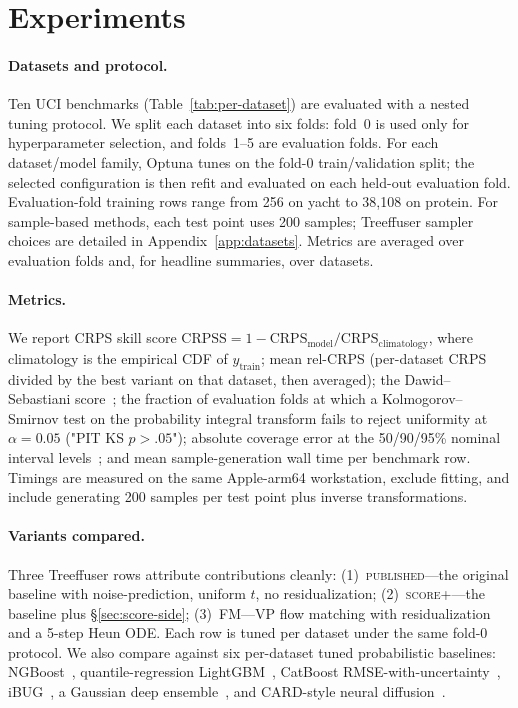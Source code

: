 \documentclass{tpm2026}
\newcommand{\crps}{\mathrm{CRPS}}
\newcommand{\crpss}{\mathrm{CRPSS}}
\begin{document}
\section{Experiments}\label{sec:exp}

\paragraph{Datasets and protocol.} Ten UCI benchmarks (Table~\ref{tab:per-dataset}) are evaluated with a nested tuning protocol. We split each dataset into six folds: fold~0 is used only for hyperparameter selection, and folds~1--5 are evaluation folds. For each dataset/model family, Optuna tunes on the fold-0 train/validation split; the selected configuration is then refit and evaluated on each held-out evaluation fold. Evaluation-fold training rows range from 256 on yacht to 38{,}108 on protein. For sample-based methods, each test point uses 200 samples; Treeffuser sampler choices are detailed in Appendix~\ref{app:datasets}. Metrics are averaged over evaluation folds and, for headline summaries, over datasets.

\paragraph{Metrics.} We report CRPS skill score $\crpss = 1 - \crps_{\text{model}} / \crps_{\text{climatology}}$, where climatology is the empirical CDF of $y_{\text{train}}$; mean rel-CRPS (per-dataset CRPS divided by the best variant on that dataset, then averaged); the Dawid--Sebastiani score~\citep{dawid1984pit}; the fraction of evaluation folds at which a Kolmogorov--Smirnov test on the probability integral transform fails to reject uniformity at $\alpha=0.05$ ("PIT KS $p{>}.05$"); absolute coverage error at the 50/90/95\% nominal interval levels~\citep{gneiting2007crps}; and mean sample-generation wall time per benchmark row. Timings are measured on the same Apple-arm64 workstation, exclude fitting, and include generating 200 samples per test point plus inverse transformations.

\paragraph{Variants compared.} Three Treeffuser rows attribute contributions cleanly: (1)~\textsc{published}---the original baseline with noise-prediction, uniform $t$, no residualization; (2)~\textsc{score+}---the baseline plus \S\ref{sec:score-side}; (3)~\textsc{FM}---VP flow matching with residualization and a 5-step Heun ODE. Each row is tuned per dataset under the same fold-0 protocol. We also compare against six per-dataset tuned probabilistic baselines: NGBoost~\citep{duan2020ngboost}, quantile-regression LightGBM~\citep{ke2017lightgbm}, CatBoost RMSE-with-uncertainty~\citep{prokhorenkova2018catboost}, iBUG~\citep{brophy2022ibug}, a Gaussian deep ensemble~\citep{lakshminarayanan2017deep}, and CARD-style neural diffusion~\citep{han2022card}.
\end{document}
